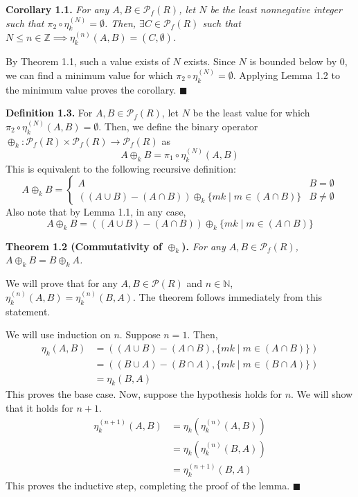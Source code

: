 \documentclass{article}
\newcommand{\zee}{\mathbb{Z}}
\newcommand{\N}{\mathbb{N}}
\begin{document}
\textbf{Corollary 1.1.} \textit{
    For any $A, B \in \mathcal{P}_f(R)$, let $N$ be the
    least nonnegative integer such that
    $\pi_2 \circ \eta_k^{(N)} = \emptyset$. Then,
    $\exists C \in \mathcal{P}_f(R)$ such that
    $N \leq n \in \zee \implies \eta_k^{(n)}(A, B) = (C, \emptyset)$.
}

By Theorem 1.1, such a value exists of $N$ exists.
Since $N$ is bounded below by 0, we can find a minimum value for which
$\pi_2 \circ \eta_k^{(N)} = \emptyset$. Applying Lemma 1.2 to the
minimum value proves the corollary. $\blacksquare$

\textbf{Definition 1.3.} For $A, B \in \mathcal{P}_f(R)$,
let $N$ be the least value for which
$\pi_2 \circ \eta_k^{(N)}(A, B) = \emptyset$. Then, we define
the binary operator $\oplus_k: \mathcal{P}_f(R) \times \mathcal{P}_f(R)
\rightarrow \mathcal{P}_f(R)$ as
\[A \oplus_k B = \pi_1 \circ \eta_k^{(N)}(A, B)\]
This is equivalent to the following recursive definition:
\[A \oplus_k B = \begin{cases}
    A & B = \emptyset \\
    ((A \cup B) - (A \cap B)) \oplus_k \{mk \mid m \in (A \cap B)\}
        & B \neq \emptyset
\end{cases}\]
Also note that by Lemma 1.1, in any case,
\[A \oplus_k B
= ((A \cup B) - (A \cap B)) \oplus_k \{mk \mid m \in (A \cap B)\}\]

\textbf{Theorem 1.2 (Commutativity of $\oplus_k$).} \textit{
    For any $A, B \in \mathcal{P}_f(R)$,
    $A \oplus_k B = B \oplus_k A$.
}

We will prove that for any $A, B \in \mathcal{P}(R)$ and $n \in \N$,
$\eta_k^{(n)}(A, B) = \eta_k^{(n)}(B, A)$. The theorem
follows immediately from this statement.

We will use induction on $n$. Suppose $n = 1$. Then,
\[\begin{split}
    \eta_k(A, B)
    &= ((A \cup B) - (A \cap B), \{mk \mid m \in (A \cap B)\}) \\
    &= ((B \cup A) - (B \cap A), \{mk \mid m \in (B \cap A)\}) \\
    &= \eta_k(B, A)
\end{split}\]
This proves the base case. Now, suppose the hypothesis holds
for $n$. We will show that it holds for $n+1$.
\[\begin{split}
    \eta_k^{(n+1)}(A, B) &= \eta_k(\eta_k^{(n)}(A, B)) \\
    &= \eta_k(\eta_k^{(n)}(B, A)) \\
    &= \eta_k^{(n+1)}(B, A)
\end{split}\]
This proves the inductive step, completing the proof of the
lemma. $\blacksquare$
\end{document}
